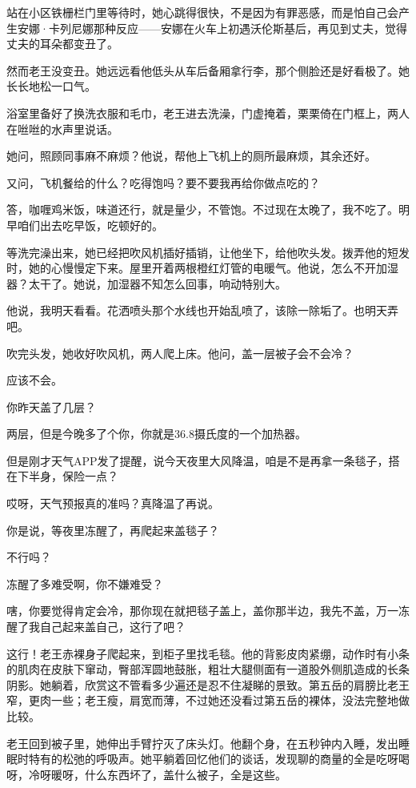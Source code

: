 \documentclass[lang=cn,newtx,12pt,scheme=chinese]{elegantbook}
\begin{document}
站在小区铁栅栏门里等待时，她心跳得很快，不是因为有罪恶感，而是怕自己会产生安娜·卡列尼娜那种反应——安娜在火车上初遇沃伦斯基后，再见到丈夫，觉得丈夫的耳朵都变丑了。

然而老王没变丑。她远远看他低头从车后备厢拿行李，那个侧脸还是好看极了。她长长地松一口气。

浴室里备好了换洗衣服和毛巾，老王进去洗澡，门虚掩着，栗栗倚在门框上，两人在咝咝的水声里说话。

她问，照顾同事麻不麻烦？他说，帮他上飞机上的厕所最麻烦，其余还好。

又问，飞机餐给的什么？吃得饱吗？要不要我再给你做点吃的？

答，咖喱鸡米饭，味道还行，就是量少，不管饱。不过现在太晚了，我不吃了。明早咱们出去吃早饭，吃顿好的。

等洗完澡出来，她已经把吹风机插好插销，让他坐下，给他吹头发。拨弄他的短发时，她的心慢慢定下来。屋里开着两根橙红灯管的电暖气。他说，怎么不开加湿器？太干了。她说，加湿器不知怎么回事，响动特别大。

他说，我明天看看。花洒喷头那个水线也开始乱喷了，该除一除垢了。也明天弄吧。

吹完头发，她收好吹风机，两人爬上床。他问，盖一层被子会不会冷？

应该不会。

你昨天盖了几层？

两层，但是今晚多了个你，你就是36.8摄氏度的一个加热器。

但是刚才天气APP发了提醒，说今天夜里大风降温，咱是不是再拿一条毯子，搭在下半身，保险一点？

哎呀，天气预报真的准吗？真降温了再说。

你是说，等夜里冻醒了，再爬起来盖毯子？

不行吗？

冻醒了多难受啊，你不嫌难受？

嗐，你要觉得肯定会冷，那你现在就把毯子盖上，盖你那半边，我先不盖，万一冻醒了我自己起来盖自己，这行了吧？

这行！老王赤裸身子爬起来，到柜子里找毛毯。他的背影皮肉紧绷，动作时有小条的肌肉在皮肤下窜动，臀部浑圆地鼓胀，粗壮大腿侧面有一道股外侧肌造成的长条阴影。她躺着，欣赏这不管看多少遍还是忍不住凝睇的景致。第五岳的肩膀比老王窄，更肉一些；老王瘦，肩宽而薄，不过她还没看过第五岳的裸体，没法完整地做比较。

老王回到被子里，她伸出手臂拧灭了床头灯。他翻个身，在五秒钟内入睡，发出睡眠时特有的松弛的呼吸声。她平躺着回忆他们的谈话，发现聊的商量的全是吃呀喝呀，冷呀暖呀，什么东西坏了，盖什么被子，全是这些。
\end{document}

